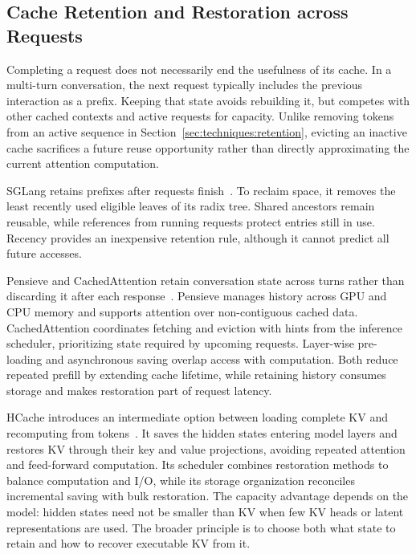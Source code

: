 \subsection{Cache Retention and Restoration across Requests}\label{sec:techniques:cache-lifetime}

Completing a request does not necessarily end the usefulness of its cache. In a multi-turn conversation, the next request typically includes the previous interaction as a prefix. Keeping that state avoids rebuilding it, but competes with other cached contexts and active requests for capacity. Unlike removing tokens from an active sequence in Section~\ref{sec:techniques:retention}, evicting an inactive cache sacrifices a future reuse opportunity rather than directly approximating the current attention computation.

SGLang retains prefixes after requests finish~\cite{kv_zheng2024sglang}. To reclaim space, it removes the least recently used eligible leaves of its radix tree. Shared ancestors remain reusable, while references from running requests protect entries still in use. Recency provides an inexpensive retention rule, although it cannot predict all future accesses.

Pensieve and CachedAttention retain conversation state across turns rather than discarding it after each response~\cite{kv_yu2025pensieve,kv_gao2024cachedattention}. Pensieve manages history across GPU and CPU memory and supports attention over non-contiguous cached data. CachedAttention coordinates fetching and eviction with hints from the inference scheduler, prioritizing state required by upcoming requests. Layer-wise pre-loading and asynchronous saving overlap access with computation. Both reduce repeated prefill by extending cache lifetime, while retaining history consumes storage and makes restoration part of request latency.

HCache introduces an intermediate option between loading complete KV and recomputing from tokens~\cite{kv_gao2025hcache}. It saves the hidden states entering model layers and restores KV through their key and value projections, avoiding repeated attention and feed-forward computation. Its scheduler combines restoration methods to balance computation and I/O, while its storage organization reconciles incremental saving with bulk restoration. The capacity advantage depends on the model: hidden states need not be smaller than KV when few KV heads or latent representations are used. The broader principle is to choose both what state to retain and how to recover executable KV from it.

